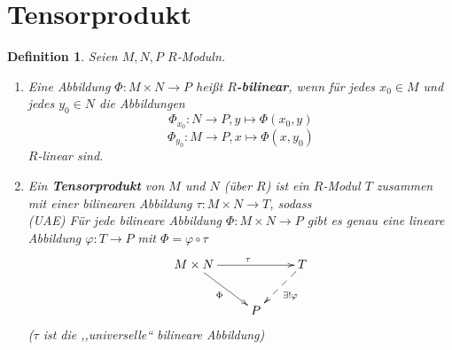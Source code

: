 \documentclass[a4paper,12pt]{scrbook}
\theoremstyle{break}
\newtheorem{Def}{Definition}[chapter]
\theoremstyle{nonumberbreak}
\theoremstyle{nonumberplain}
\newcommand{\emp}[1]{\textbf{\emph{#1}}}
\begin{document}
\section{Tensorprodukt}

\begin{Def}
  Seien $M, N, P$ $R$-Moduln.

  \begin{enumerate}
    \item Eine Abbildung $\Phi: M \times N \to P$ heißt
          \emp{$R$-bilinear}, wenn für jedes $x_0 \in M$ und
          jedes $y_0 \in N$ die Abbildungen 
          \[\Phi_{x_0}: N \to P, y \mapsto \Phi(x_0,y)\]
          \[\Phi_{y_0}: M \to P, x \mapsto \Phi(x,y_0)\] $R$-linear sind.
    \item Ein \emp{Tensorprodukt} von $M$ und $N$ (über $R$)
          ist ein $R$-Modul $T$ zusammen mit einer bilinearen Abbildung $\tau: M
          \times N \to T$, sodass\\
          (UAE) Für jede bilineare Abbildung $\Phi: M \times N \to P$ gibt es
          genau eine lineare Abbildung $\varphi: T \to P$ mit $\Phi = \varphi \circ
          \tau$
          \[
            \begin{xy}
              \xymatrix{
                M \times N \ar[rr]^{\tau} \ar[rd]_{\Phi}  &     &  T \ar@{-->}[dl]^{\exists!\varphi}  \\
                                                          &  P  &
              }
            \end{xy}
          \]
          ($\tau$ ist die ,,universelle`` bilineare Abbildung)
  \end{enumerate}
\end{Def}
\end{document}
